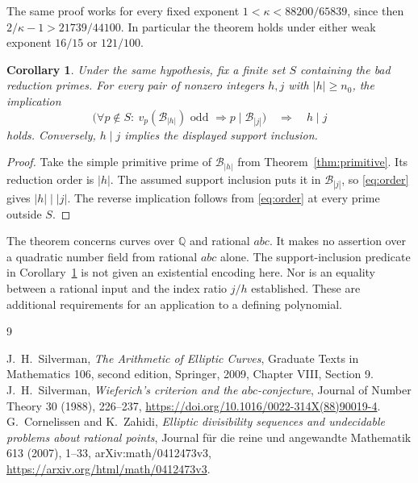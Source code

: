 \documentclass[11pt,a4paper]{article}
\newtheorem{corollary}[theorem]{Corollary}
\newcommand{\Q}{\mathbb Q}\newcommand{\Z}{\mathbb Z}
\begin{document}
The same proof works for every fixed exponent
$1<\kappa<88200/65839$, since then
$2/\kappa-1>21739/44100$. In particular the theorem holds under
either weak exponent $16/15$ or $121/100$.

\begin{corollary}\label{cor:divides}
Under the same hypothesis, fix a finite set $S$ containing the bad
reduction primes. For every pair of nonzero integers $h,j$ with
$|h|\ge n_0$, the implication
\[
 \bigl(\forall p\notin S:\ v_p(\mathcal B_{|h|})\text{ odd }
                                      \Longrightarrow p\mid \mathcal B_{|j|}\bigr)
                          \quad\Longrightarrow\quad h\mid j
\]
holds. Conversely, $h\mid j$ implies the displayed support inclusion.
\end{corollary}
\begin{proof}
Take the simple primitive prime of $\mathcal B_{|h|}$ from
Theorem~\ref{thm:primitive}. Its reduction order is $|h|$.
The assumed support inclusion puts it in $\mathcal B_{|j|}$, so
\eqref{eq:order} gives $|h|\mid |j|$. The reverse implication
follows from \eqref{eq:order} at every prime outside $S$.
\end{proof}

The theorem concerns curves over $\Q$ and rational $abc$.
It makes no assertion over a quadratic number field from rational
$abc$ alone. The support-inclusion predicate in Corollary~\ref{cor:divides}
is not given an existential encoding here. Nor is an equality between
a rational input and the index ratio $j/h$ established. These are
additional requirements for an application to a defining polynomial.

\begin{thebibliography}{9}\raggedright
{}J.~H.~Silverman, \emph{The Arithmetic of Elliptic Curves},
Graduate Texts in Mathematics 106, second edition, Springer, 2009,
Chapter VIII, Section 9.
J.~H.~Silverman,
\emph{Wieferich's criterion and the $abc$-conjecture},
Journal of Number Theory 30 (1988), 226--237,
\url{https://doi.org/10.1016/0022-314X(88)90019-4}.
G.~Cornelissen and K.~Zahidi,
\emph{Elliptic divisibility sequences and undecidable problems about
rational points}, Journal f\"ur die reine und angewandte Mathematik
613 (2007), 1--33, arXiv:math/0412473v3,
\url{https://arxiv.org/html/math/0412473v3}.
\end{thebibliography}
\end{document}
